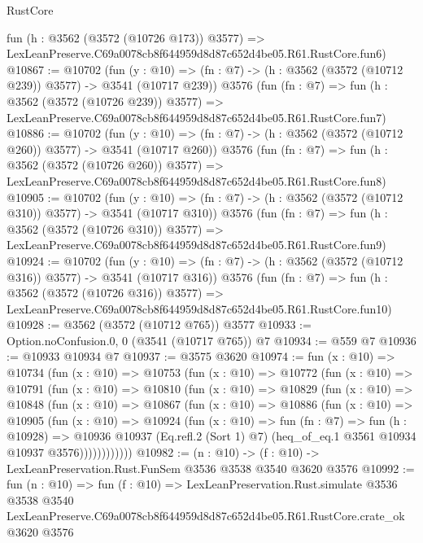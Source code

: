\begin{lexlean}{RustCore}
\begin{coremodule}
    fun (h : @3562 (@3572 (@10726 @173)) @3577) =>
    LexLeanPreserve.C69a0078cb8f644959d8d87c652d4be05.R61.RustCore.fun6)
@10867 := @10702
    (fun (y : @10) => (fn : @7) -> (h : @3562 (@3572 (@10712 @239)) @3577) -> @3541 (@10717 @239))
    @3576
    (fun (fn : @7) =>
    fun (h : @3562 (@3572 (@10726 @239)) @3577) =>
    LexLeanPreserve.C69a0078cb8f644959d8d87c652d4be05.R61.RustCore.fun7)
@10886 := @10702
    (fun (y : @10) => (fn : @7) -> (h : @3562 (@3572 (@10712 @260)) @3577) -> @3541 (@10717 @260))
    @3576
    (fun (fn : @7) =>
    fun (h : @3562 (@3572 (@10726 @260)) @3577) =>
    LexLeanPreserve.C69a0078cb8f644959d8d87c652d4be05.R61.RustCore.fun8)
@10905 := @10702
    (fun (y : @10) => (fn : @7) -> (h : @3562 (@3572 (@10712 @310)) @3577) -> @3541 (@10717 @310))
    @3576
    (fun (fn : @7) =>
    fun (h : @3562 (@3572 (@10726 @310)) @3577) =>
    LexLeanPreserve.C69a0078cb8f644959d8d87c652d4be05.R61.RustCore.fun9)
@10924 := @10702
    (fun (y : @10) => (fn : @7) -> (h : @3562 (@3572 (@10712 @316)) @3577) -> @3541 (@10717 @316))
    @3576
    (fun (fn : @7) =>
    fun (h : @3562 (@3572 (@10726 @316)) @3577) =>
    LexLeanPreserve.C69a0078cb8f644959d8d87c652d4be05.R61.RustCore.fun10)
@10928 := @3562 (@3572 (@10712 @765)) @3577
@10933 := Option.noConfusion.{0, 0} (@3541 (@10717 @765)) @7
@10934 := @559 @7
@10936 := @10933 @10934 @7
@10937 := @3575 @3620
@10974 := fun (x : @10) =>
  @10734
    (fun (x : @10) =>
    @10753
      (fun (x : @10) =>
      @10772
        (fun (x : @10) =>
        @10791
          (fun (x : @10) =>
          @10810
            (fun (x : @10) =>
            @10829
              (fun (x : @10) =>
              @10848
                (fun (x : @10) =>
                @10867
                  (fun (x : @10) =>
                  @10886
                    (fun (x : @10) =>
                    @10905
                      (fun (x : @10) =>
                      @10924
                        (fun (x : @10) =>
                        fun (fn : @7) =>
                        fun (h : @10928) =>
                        @10936
                          @10937
                          (Eq.refl.{2} (Sort 1) @7)
                          (heq_of_eq.{1} @3561 @10934 @10937 @3576))))))))))))
@10982 := (n : @10) -> (f : @10) -> LexLeanPreservation.Rust.FunSem @3536 @3538 @3540 @3620 @3576
@10992 := fun (n : @10) =>
  fun (f : @10) =>
  LexLeanPreservation.Rust.simulate
    @3536
    @3538
    @3540
    LexLeanPreserve.C69a0078cb8f644959d8d87c652d4be05.R61.RustCore.crate_ok
    @3620
    @3576
\end{coremodule}
\end{lexlean}
